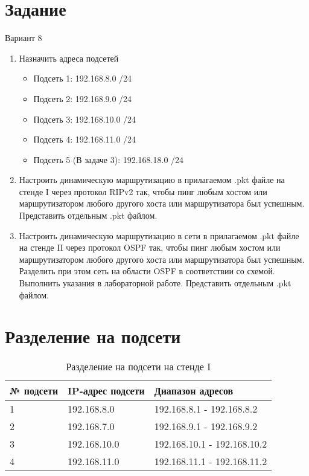 \documentclass[a4paper, 14pt]{article}
\begin{document}
\section*{Задание}

Вариант 8 

\begin{enumerate}

\item Назначить адреса подсетей
\begin{itemize}
\item	Подсеть 1: 192.168.8.0 /24
\item	Подсеть 2: 192.168.9.0 /24
\item	Подсеть 3: 192.168.10.0 /24
\item	Подсеть 4: 192.168.11.0 /24
\item	Подсеть 5 (В задаче 3): 192.168.18.0 /24
\end{itemize}

\item Настроить динамическую маршрутизацию в прилагаемом .pkt файле на стенде I через протокол RIPv2 так, чтобы пинг любым хостом или маршрутизатором любого другого хоста или маршрутизатора был успешным.
Представить отдельным .pkt файлом. 

\item Настроить динамическую маршрутизацию в сети в прилагаемом .pkt файле на стенде II через протокол OSPF так, чтобы пинг любым хостом или маршрутизатором любого другого хоста или маршрутизатора был успешным. Разделить при этом сеть на области OSPF в соответствии со схемой. Выполнить указания в лабораторной работе.
Представить отдельным .pkt файлом. 


\end{enumerate}

\section*{Разделение на подсети}

\begin{table}[H]
    \centering
    \caption{Разделение на подсети на стенде I}
    \begin{tabular}{|p{0.8cm}|p{3cm}|p{6cm}|}
        \hline
        № подсети & IP-адрес подсети & Диапазон адресов  \\
        \hline
        1 & 192.168.8.0 & 192.168.8.1 - 192.168.8.2  \\
        \hline
        2 & 192.168.7.0 & 192.168.9.1 - 192.168.9.2  \\
        \hline
        3 & 192.168.10.0 & 192.168.10.1 - 192.168.10.2  \\
        \hline
        4 & 192.168.11.0 & 192.168.11.1 - 192.168.11.2 \\
        \hline
    \end{tabular}
\end{table}
\end{document}
